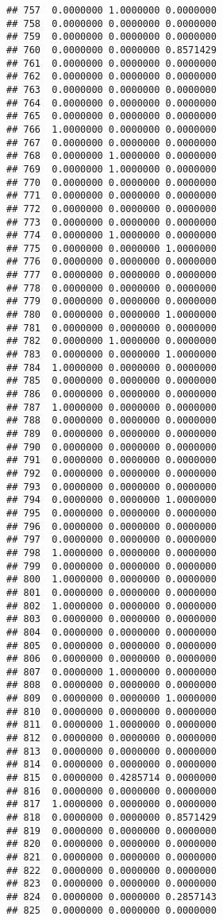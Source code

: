 \documentclass[
]{article}
\begin{document}
\begin{verbatim}
## 757  0.0000000 1.0000000 0.0000000
## 758  0.0000000 0.0000000 0.0000000
## 759  0.0000000 0.0000000 0.0000000
## 760  0.0000000 0.0000000 0.8571429
## 761  0.0000000 0.0000000 0.0000000
## 762  0.0000000 0.0000000 0.0000000
## 763  0.0000000 0.0000000 0.0000000
## 764  0.0000000 0.0000000 0.0000000
## 765  0.0000000 0.0000000 0.0000000
## 766  1.0000000 0.0000000 0.0000000
## 767  0.0000000 0.0000000 0.0000000
## 768  0.0000000 1.0000000 0.0000000
## 769  0.0000000 1.0000000 0.0000000
## 770  0.0000000 0.0000000 0.0000000
## 771  0.0000000 0.0000000 0.0000000
## 772  0.0000000 0.0000000 0.0000000
## 773  0.0000000 0.0000000 0.0000000
## 774  0.0000000 1.0000000 0.0000000
## 775  0.0000000 0.0000000 1.0000000
## 776  0.0000000 0.0000000 0.0000000
## 777  0.0000000 0.0000000 0.0000000
## 778  0.0000000 0.0000000 0.0000000
## 779  0.0000000 0.0000000 0.0000000
## 780  0.0000000 0.0000000 1.0000000
## 781  0.0000000 0.0000000 0.0000000
## 782  0.0000000 1.0000000 0.0000000
## 783  0.0000000 0.0000000 1.0000000
## 784  1.0000000 0.0000000 0.0000000
## 785  0.0000000 0.0000000 0.0000000
## 786  0.0000000 0.0000000 0.0000000
## 787  1.0000000 0.0000000 0.0000000
## 788  0.0000000 0.0000000 0.0000000
## 789  0.0000000 0.0000000 0.0000000
## 790  0.0000000 0.0000000 0.0000000
## 791  0.0000000 0.0000000 0.0000000
## 792  0.0000000 0.0000000 0.0000000
## 793  0.0000000 0.0000000 0.0000000
## 794  0.0000000 0.0000000 1.0000000
## 795  0.0000000 0.0000000 0.0000000
## 796  0.0000000 0.0000000 0.0000000
## 797  0.0000000 0.0000000 0.0000000
## 798  1.0000000 0.0000000 0.0000000
## 799  0.0000000 0.0000000 0.0000000
## 800  1.0000000 0.0000000 0.0000000
## 801  0.0000000 0.0000000 0.0000000
## 802  1.0000000 0.0000000 0.0000000
## 803  0.0000000 0.0000000 0.0000000
## 804  0.0000000 0.0000000 0.0000000
## 805  0.0000000 0.0000000 0.0000000
## 806  0.0000000 0.0000000 0.0000000
## 807  0.0000000 1.0000000 0.0000000
## 808  0.0000000 0.0000000 0.0000000
## 809  0.0000000 0.0000000 1.0000000
## 810  0.0000000 0.0000000 0.0000000
## 811  0.0000000 1.0000000 0.0000000
## 812  0.0000000 0.0000000 0.0000000
## 813  0.0000000 0.0000000 0.0000000
## 814  0.0000000 0.0000000 0.0000000
## 815  0.0000000 0.4285714 0.0000000
## 816  0.0000000 0.0000000 0.0000000
## 817  1.0000000 0.0000000 0.0000000
## 818  0.0000000 0.0000000 0.8571429
## 819  0.0000000 0.0000000 0.0000000
## 820  0.0000000 0.0000000 0.0000000
## 821  0.0000000 0.0000000 0.0000000
## 822  0.0000000 0.0000000 0.0000000
## 823  0.0000000 0.0000000 0.0000000
## 824  0.0000000 0.0000000 0.2857143
## 825  0.0000000 0.0000000 0.0000000

\end{verbatim}
\end{document}
